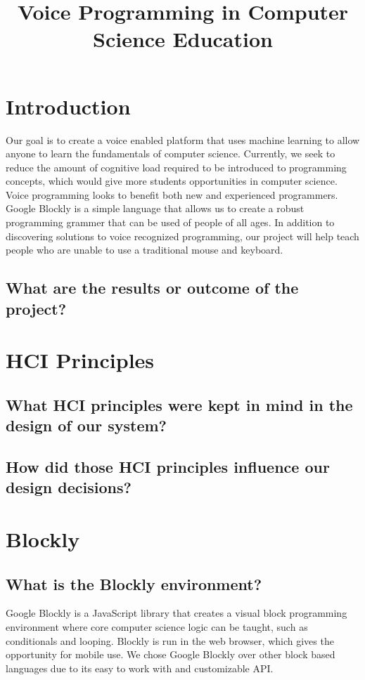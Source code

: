 \documentclass[]{article}
\title{Voice Programming in Computer Science Education}
\begin{document}
\maketitle

\section{Introduction}

Our goal is to create a voice enabled platform that uses machine learning to allow 
anyone to learn the fundamentals of computer science. Currently, we seek to reduce the amount
of cognitive load required to be introduced to programming concepts, which would give more 
students opportunities in computer science. 
\\ 
Voice programming looks to benefit both new and experienced programmers.  
Google Blockly is a simple language that allows us to create a robust programming grammer 
that can be used of people of all ages. In addition to discovering solutions to voice 
recognized programming, our project will help teach people who are unable to use a traditional mouse and keyboard.

\subsection{What are the results or outcome of the project?}

\section{HCI Principles}

\subsection{What HCI principles were kept in mind in the design of our system?}

\subsection{How did those HCI principles influence our design decisions?}

\section{Blockly}

\subsection{What is the Blockly environment?}
Google Blockly is a JavaScript library that creates a visual block programming 
environment where core computer science logic can be taught, such as conditionals and 
looping. Blockly is run in the web browser, which gives the opportunity for mobile use. We chose Google Blockly over other block based languages due to its easy to
work with and customizable API.
\end{document}
